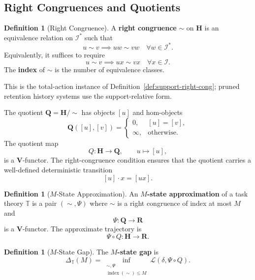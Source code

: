 \documentclass[12pt]{article}
\theoremstyle{definition}
\newtheorem{definition}[theorem]{Definition}
\begin{document}
\subsection{Right Congruences and Quotients}
\label{subsec:right-cong}

\begin{definition}[Right Congruence]
\label{def:right-cong}
A \textbf{right congruence} $\sim$ on $\mathbf H$ is an equivalence relation
on $\mathcal I^*$ such that
\[
u\sim v
\implies
uw\sim vw
\quad
\forall w\in\mathcal I^*.
\]
Equivalently, it suffices to require
\[
u\sim v
\implies
ux\sim vx
\quad
\forall x\in\mathcal I.
\]
The \textbf{index} of $\sim$ is the number of equivalence classes.
\end{definition}

This is the total-action instance of Definition~\ref{def:support-right-cong};
pruned retention history systems use the support-relative form.

The quotient $\mathbf Q=\mathbf H/\!\sim$ has objects $[u]$ and hom-objects
\[
\mathbf Q([u],[v])=
\begin{cases}
0,&[u]=[v],\\
\infty,&\text{otherwise}.
\end{cases}
\]
The quotient map
\[
Q:\mathbf H\to\mathbf Q,
\qquad
u\mapsto[u],
\]
is a $\mathbf V$-functor.  The right-congruence condition ensures that the
quotient carries a well-defined deterministic transition
\[
[u]\cdot x=[ux].
\]

\begin{definition}[$M$-State Approximation]
\label{def:M-state-approx}
An \textbf{$M$-state approximation} of a task theory $\mathbb T$ is a pair
$(\sim,\Psi)$ where $\sim$ is a right congruence of index at most $M$ and
\[
\Psi:\mathbf Q\to\mathbf R
\]
is a $\mathbf V$-functor.  The approximate trajectory is
\[
\Psi\circ Q:\mathbf H\to\mathbf R.
\]
\end{definition}

\begin{definition}[$M$-State Gap]
\label{def:M-state-gap}
The \textbf{$M$-state gap} is
\[
\Delta_{\mathbb T}(M)
=
\inf_{\substack{\sim,\Psi\\ \operatorname{index}(\sim)\le M}}
\mathcal L(\delta,\Psi\circ Q).
\]
\end{definition}
\end{document}
